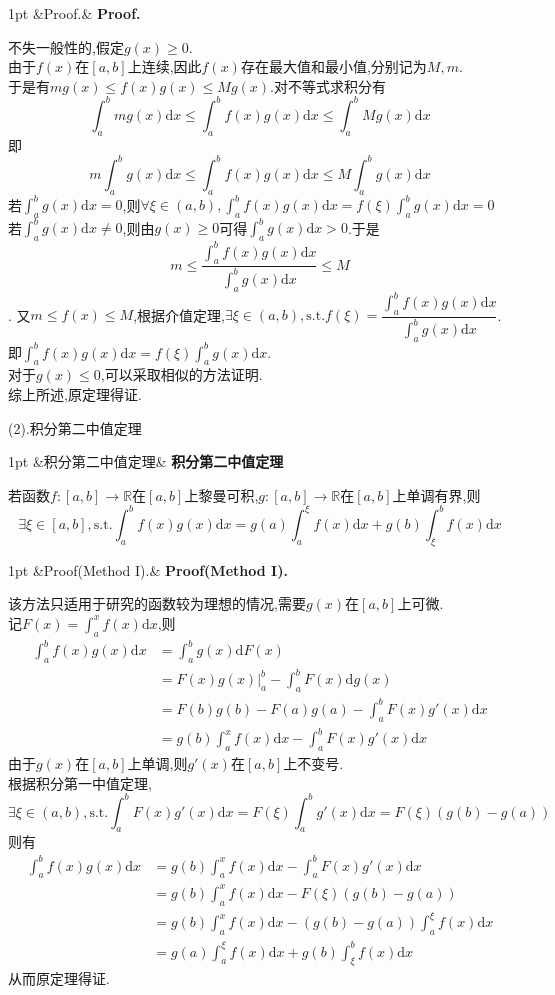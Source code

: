 \documentclass{ctexart}
\newcommand{\di}{\mathrm{d}}
\newcommand{\R}{\mathbb{R}}
\newcommand{\st}{,\text{s.t.}}
\newcommand{\dx}{\di x}
\newenvironment{formal}[1][]{%
\def\FrameCommand{%
\hspace{1pt}%
{\color{DarkBlue}\vrule width 2pt}%
{\color{formalshade}\vrule width 4pt}%
\colorbox{formalshade}%
}%
\MakeFramed{\advance\hsize-\width\FrameRestore}%
\noindent\hspace{-4.55pt}%
\begin{adjustwidth}{}{1pt}%
\setlength{\parindent}{0pt}%
\vspace{3pt}%
\ifx&#1&\else %
    \textbf{#1}\par\vspace{1pt}%
\fi
}
{%
\vspace{2pt}%
\end{adjustwidth}\endMakeFramed%
}
\newenvironment{solution}[1][]{%
\def\FrameCommand{%
\hspace{1pt}%
{\color{solutionline}\vrule width 2pt}%
{\color{solutionshade}\vrule width 4pt}%
\colorbox{solutionshade}%
}%
\MakeFramed{\advance\hsize-\width\FrameRestore}%
\noindent\hspace{-4.55pt}%
\begin{adjustwidth}{}{1pt}%
\setlength{\parindent}{0pt}%
\vspace{3pt}%
\ifx&#1&\else %
    \textbf{#1}\par\vspace{1pt}%
\fi
}
{%
\vspace{2pt}%
\end{adjustwidth}\endMakeFramed%
}
\begin{document}
\begin{solution}[Proof.]
    不失一般性的,假定$g(x)\geqslant 0$.\\
    由于$f(x)$在$[a,b]$上连续,因此$f(x)$存在最大值和最小值,分别记为$M,m$.\\
    于是有$mg(x)\leqslant f(x)g(x)\leqslant Mg(x)$.对不等式求积分有
    $$\int_{a}^{b}{mg(x)\dx}\leqslant\int_{a}^{b}{f(x)g(x)\dx}\leqslant\int_{a}^{b}{Mg(x)\dx}$$
    即$$m\int_{a}^{b}{g(x)\dx}\leqslant\int_{a}^{b}{f(x)g(x)\dx}\leqslant M\int_{a}^{b}{g(x)\dx}$$
    若$\displaystyle\int_{a}^{b}{g(x)\dx}=0$,则$\displaystyle\forall\xi\in(a,b),\int_{a}^{b}{f(x)g(x)\dx}=f(\xi)\int_{a}^{b}{g(x)\dx}=0$\\
    若$\displaystyle\int_{a}^{b}{g(x)\dx}\neq 0$,则由$g(x)\geqslant 0$可得$\displaystyle\int_{a}^{b}{g(x)\dx}>0$.于是
    $$m\leqslant\dfrac{\int_{a}^{b}{f(x)g(x)\dx}}{\int_{a}^{b}{g(x)\dx}}\leqslant M$$.
    又$m\leqslant f(x)\leqslant M$,根据介值定理,$\exists\xi\in(a,b)\st f(\xi)=\dfrac{\int_{a}^{b}{f(x)g(x)\dx}}{\int_{a}^{b}{g(x)\dx}}$.\\
    即$\displaystyle\int_{a}^{b}{f(x)g(x)\dx}=f(\xi)\int_{a}^{b}{g(x)\dx}$.\\
    对于$g(x)\leqslant 0$,可以采取相似的方法证明.\\
    综上所述,原定理得证.
\end{solution}\noindent
(2).积分第二中值定理
\begin{formal}[积分第二中值定理]
    若函数$f:[a,b]\to\R$在$[a,b]$上黎曼可积,$g:[a,b]\to\R$在$[a,b]$上单调有界,则
    $$\exists\xi\in[a,b]\st\int_{a}^{b}{f(x)g(x)\dx}=g(a)\int_{a}^{\xi}{f(x)\dx}+g(b)\int_{\xi}^{b}{f(x)\dx}$$
\end{formal}
\begin{solution}[Proof(Method I).]
    该方法只适用于研究的函数较为理想的情况,需要$g(x)$在$[a,b]$上可微.\\
    记$\displaystyle F(x)=\int_{a}^{x}{f(x)\dx}$,则
    $$\begin{aligned}
        \int_{a}^{b}{f(x)g(x)\dx}
        &= \int_{a}^{b}{g(x)\di F(x)} \\
        &= \left.F(x)g(x)\right|_{a}^{b}-\int_{a}^{b}{F(x)\di g(x)} \\
        &= F(b)g(b)-F(a)g(a)-\int_{a}^{b}{F(x)g'(x)\dx} \\
        &= g(b)\int_{a}^{x}{f(x)\dx}-\int_{a}^{b}{F(x)g'(x)\dx}
    \end{aligned}$$
    由于$g(x)$在$[a,b]$上单调,则$g'(x)$在$[a,b]$上不变号.\\
    根据积分第一中值定理,$$\exists\xi\in(a,b)\st\int_{a}^{b}{F(x)g'(x)\dx}=F(\xi)\int_{a}^{b}{g'(x)\dx}=F(\xi)(g(b)-g(a))$$
    则有$$\begin{aligned}
        \int_{a}^{b}{f(x)g(x)\dx}
        &= g(b)\int_{a}^{x}{f(x)\dx}-\int_{a}^{b}{F(x)g'(x)\dx} \\
        &= g(b)\int_{a}^{x}{f(x)\dx}-F(\xi)(g(b)-g(a)) \\
        &= g(b)\int_{a}^{x}{f(x)\dx}-(g(b)-g(a))\int_{a}^{\xi}{f(x)\dx} \\
        &= g(a)\int_{a}^{\xi}{f(x)\dx}+g(b)\int_{\xi}^{b}{f(x)\dx}
    \end{aligned}$$
    从而原定理得证.
\end{solution}\noindent
\end{document}
